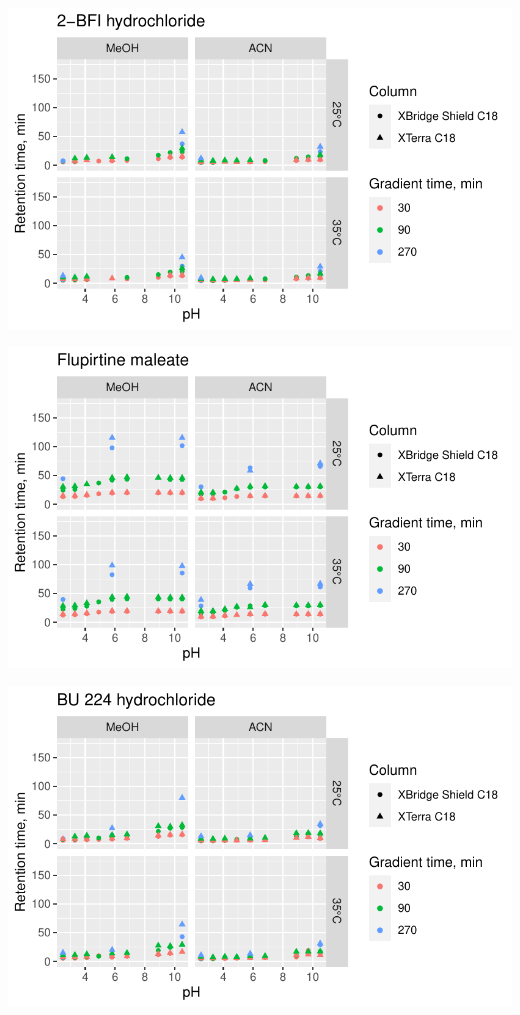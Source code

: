 \documentclass[
  letterpaper,
  DIV=11,
  numbers=noendperiod]{scrreprt}
\begin{document}
\includegraphics{index_files/figure-pdf/unnamed-chunk-4-168.pdf}

\includegraphics{index_files/figure-pdf/unnamed-chunk-4-169.pdf}

\includegraphics{index_files/figure-pdf/unnamed-chunk-4-170.pdf}
\end{document}
